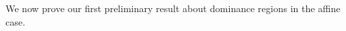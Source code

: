 \documentclass[10pt]{article}
\newtheorem{lemma}[proposition]{Lemma}
\theoremstyle{definition}
\theoremstyle{remark}
\numberwithin{equation}{section}
\newcommand{\set}[1]{{\lbrace #1 \rbrace}}
\newcommand{\br}[1]{{\langle #1 \rangle}}
\newcommand{\brr}[1]{{\bigl\langle #1 \bigr\rangle}}
\newcommand{\0}{{\mathbf{0}}}
\newcommand{\fin}{\mathrm{fin}}
\newcommand{\RSChar}{\Phi}
\newcommand{\RS}{\RSChar}
\newcommand{\RSfin}{\RS_\fin}
\begin{document}
%

We now prove our first preliminary result about dominance regions in the affine case.
\end{document}
